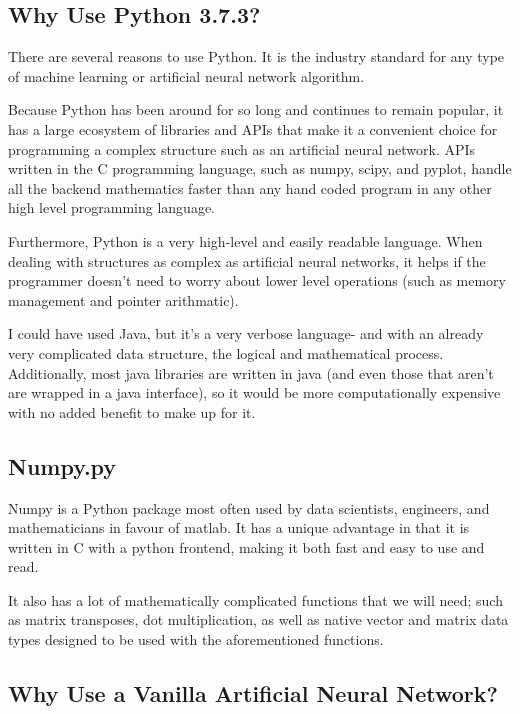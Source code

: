 \documentclass[12pt]{article}
\begin{document}
    \subsection{Why Use Python 3.7.3?}

        There are several reasons to use Python. It is the industry standard for any type of machine learning or artificial neural network algorithm.

        Because Python has been around for so long and continues to remain popular, it has a large ecosystem of libraries and APIs that make it a convenient choice for programming a complex structure such as an artificial neural network. APIs written in the C programming language, such as numpy, scipy, and pyplot, handle all the backend mathematics faster than any hand coded program in any other high level programming language.
    
        Furthermore, Python is a very high-level and easily readable language. When dealing with structures as complex as artificial neural networks, it helps if the programmer doesn't need to worry about lower level operations (such as memory management and pointer arithmatic).

        I could have used Java, but it's a very verbose language- and with an already very complicated data structure, the logical and mathematical process. Additionally, most java libraries are written in java (and even those that aren't are wrapped in a java interface), so it would be more computationally expensive with no added benefit to make up for it.

    \subsection{Numpy.py}

        Numpy is a Python package most often used by data scientists, engineers, and mathematicians in favour of matlab. It has a unique advantage in that it is written in C with a python frontend, making it both fast and easy to use and read.

        It also has a lot of mathematically complicated functions that we will need; such as matrix transposes, dot multiplication, as well as native vector and matrix data types designed to be used with the aforementioned functions.

    \subsection{Why Use a Vanilla Artificial Neural Network?
    }
\end{document}
